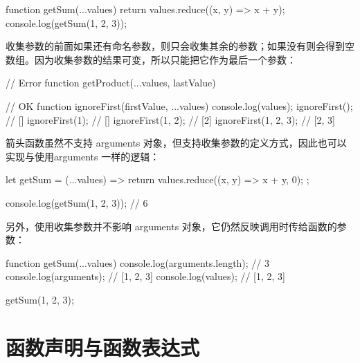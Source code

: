 \begin{js}
function getSum(...values) {
  return values.reduce((x, y) => x + y);
}
console.log(getSum(1, 2, 3));
\end{js}

收集参数的前面如果还有命名参数，则只会收集其余的参数；如果没有则会得到空数组。因为收集参数的结果可变，所以只能把它作为最后一个参数：
\begin{js}
// Error
function getProduct(...values, lastValue) { }

// OK
function ignoreFirst(firstValue, ...values) {
  console.log(values);
}
ignoreFirst(); // []
ignoreFirst(1); // []
ignoreFirst(1, 2); // [2]
ignoreFirst(1, 2, 3); // [2, 3]
\end{js}

箭头函数虽然不支持 arguments 对象，但支持收集参数的定义方式，因此也可以实现与使用arguments 一样的逻辑：
\begin{js}
let getSum = (...values) => {
  return values.reduce((x, y) => x + y, 0);
};

console.log(getSum(1, 2, 3)); // 6
\end{js}

另外，使用收集参数并不影响 arguments 对象，它仍然反映调用时传给函数的参数：
\begin{js}
function getSum(...values) {
  console.log(arguments.length); // 3
  console.log(arguments); // [1, 2, 3]
  console.log(values); // [1, 2, 3]
}

getSum(1, 2, 3);
\end{js}
\section{函数声明与函数表达式}